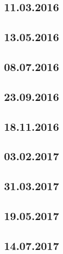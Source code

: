 \documentclass[a4paper,12p]{article}
\begin{document}
	\newpage
	\subsection{11.03.2016}
	
	
	
	
	
	\subsection{13.05.2016}
	
	
	
	
	\newpage
	\subsection{08.07.2016}
	
	
	
	
	\newpage
	\subsection{23.09.2016}
	
	
	
	
	\newpage
	\subsection{18.11.2016}
	
	
	
	
	\subsection{03.02.2017}
	
	
	
	
	\subsection{31.03.2017}
	
	
	
	
	\subsection{19.05.2017}
	
	
	
	
	\subsection{14.07.2017}
	
	
	
	
	
\end{document}
